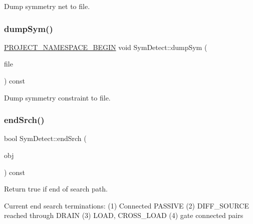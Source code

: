 Dump symmetry net to file. 

\mbox{\label{classSymDetect_a12ab74214af31ed8fc5608e958e74786}} 
\subsubsection{\texorpdfstring{dump\+Sym()}{dumpSym()}}
{\footnotesize\ttfamily \hyperlink{namespace_8h_ae48726a24dab2034454cf6d79e531eb8}{P\+R\+O\+J\+E\+C\+T\+\_\+\+N\+A\+M\+E\+S\+P\+A\+C\+E\+\_\+\+B\+E\+G\+IN} void Sym\+Detect\+::dump\+Sym (\begin{DoxyParamCaption}\item[{const std\+::string}]{file }\end{DoxyParamCaption}) const}



Dump symmetry constraint to file. 

\mbox{\label{classSymDetect_ac46824a93f71489b6c9f1aec961a0f8d}} 
\subsubsection{\texorpdfstring{end\+Srch()}{endSrch()}}
{\footnotesize\ttfamily bool Sym\+Detect\+::end\+Srch (\begin{DoxyParamCaption}\item[{\hyperlink{classMosPair}{Mos\+Pair} \&}]{obj }\end{DoxyParamCaption}) const\hspace{0.3cm}{\ttfamily [private]}}



Return true if end of search path. 

Current end search terminations\+: (1) Connected P\+A\+S\+S\+I\+VE (2) D\+I\+F\+F\+\_\+\+S\+O\+U\+R\+CE reached through D\+R\+A\+IN (3) L\+O\+AD, C\+R\+O\+S\+S\+\_\+\+L\+O\+AD (4) gate connected pairs \mbox{\label{classSymDetect_a0e73f6d9d0b83b0c42c569fc42f8ecd2}} 
